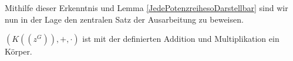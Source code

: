 %
%
%
%
%
%
%
%
%
% 
%
%
%
%
%
% 
%
%
%
Mithilfe dieser Erkenntnis und Lemma \ref{JedePotenzreihesoDarstellbar} sind wir nun in der Lage den zentralen Satz der Ausarbeitung zu beweisen.
%
\begin{satz}
$\left(K\left(\left(z^{G}\right)\right), +, \cdot\right)$ ist mit der definierten Addition und Multiplikation ein Körper.
\end{satz}
